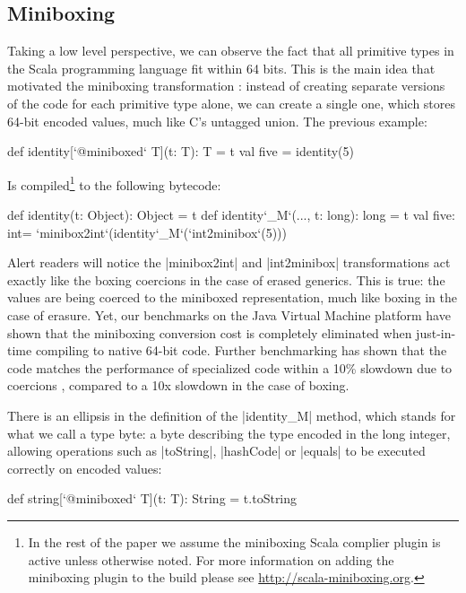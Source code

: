 \subsection{Miniboxing}

Taking a low level perspective, we can observe the fact that all primitive types in the Scala programming language fit within 64 bits. This is the main idea that motivated the miniboxing transformation \cite{miniboxing}: instead of creating separate versions of the code for each primitive type alone, we can create a single one, which stores 64-bit encoded values, much like C's untagged union. The previous example:

\begin{lstlisting-nobreak}
 def identity[`@miniboxed` T](t: T): T = t
 val five = identity(5)
\end{lstlisting-nobreak}

Is compiled\footnote{In the rest of the paper we assume the miniboxing Scala complier plugin is active unless otherwise noted. For more information on adding the miniboxing plugin to the build please see \url{http://scala-miniboxing.org}.} to the following bytecode:

\begin{lstlisting-nobreak}
 def identity(t: Object): Object = t
 def identity`_M`(..., t: long): long = t
 val five: int= `minibox2int`(identity`_M`(`int2minibox`(5)))
\end{lstlisting-nobreak}

Alert readers will notice the |minibox2int| and |int2minibox| transformations act exactly like the boxing coercions in the case of erased generics. This is true: the values are being coerced to the miniboxed representation, much like boxing in the case of erasure. Yet, our benchmarks on the Java Virtual Machine platform have shown that the miniboxing conversion cost is completely eliminated when just-in-time compiling to native 64-bit code. Further benchmarking has shown that the code matches the performance of specialized code within a 10\% slowdown due to coercions \cite{miniboxing}, compared to a 10x slowdown in the case of boxing.

There is an ellipsis in the definition of the |identity_M| method, which stands for what we call a type byte: a byte describing the type encoded in the long integer, allowing operations such as |toString|, |hashCode| or |equals| to be executed correctly on encoded values:

\begin{lstlisting-nobreak}
 def string[`@miniboxed` T](t: T): String = t.toString
\end{lstlisting-nobreak}

